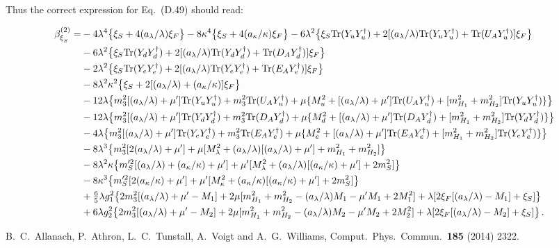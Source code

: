 \documentclass[final,3p,times,pdflatex]{elsarticle}
\newcommand{\lamsq}{\lambda^2}
\newcommand{\kapsq}{\kappa^2}
\newcommand{\tr}{\mathrm{Tr}}
\newcommand{\mhusq}{m^2_{H_2}}
\newcommand{\mhdsq}{m^2_{H_1}}
\newcommand{\mlamsq}{M_\lambda^2}
\newcommand{\mkapsq}{M_\kappa^2}
\newcommand{\mssq}{m_S^2}
\newcommand{\mtrisq}{m_3^2}
\newcommand{\msprsq}{m_S'^2}
\newcommand{\Alam}{a_\lambda/\lambda}
\newcommand{\Akap}{a_\kappa/\kappa}
\newcommand{\Musq}{M_u^2}
\newcommand{\Mdsq}{M_d^2}
\newcommand{\Mesq}{M_e^2}
\begin{document}
Thus the correct expression for Eq.\ (D.49) should read:

\begin{align}
  \beta_{\xi^{}_S}^{(2)} =& -4\lambda^4\big\{ \xi_S + 4(\Alam)\xi_F\big\}
  - 8\kappa^4\big\{ \xi_S + 4(\Akap)\xi_F\big\}
  -6\lamsq\big\{ \xi_S\tr( Y_u Y_u^\dagger)+ 2[(\Alam)\tr( Y_u Y_u^\dagger) + \tr( U_A Y_u^\dagger)] \xi_F \big\} \notag \\
  &-6\lamsq\big\{\xi_S\tr( Y_d Y_d^\dagger) + 2[(\Alam)\tr( Y_d Y_d^\dagger) + \tr( D_A Y_d^\dagger)] \xi_F\big\}  \notag \\
  &-2\lamsq\big\{\xi_S\tr( Y_e Y_e^\dagger) + 2[(\Alam)\tr( Y_e Y_e^\dagger) + \tr( E_A Y_e^\dagger)] \xi_F \big\} \notag \\
  &-8\lamsq\kapsq\big\{ \xi_S + 2[(\Alam) + (\Akap)]\xi_F\big\} \notag \\
  &-12\lambda\big\{ \mtrisq[(\Alam) + \mu']\tr( Y_u Y_u^\dagger) + \mtrisq\tr( U_A Y_u^\dagger)
  + \mu\{\Musq + [(\Alam) + \mu']\tr( U_A Y_u^\dagger) + [\mhdsq + \mhusq]\tr( Y_u Y_u^\dagger)\} \big\} \notag \\
  &-12\lambda\big\{ \mtrisq[(\Alam) + \mu']\tr( Y_d Y_d^\dagger) + \mtrisq\tr( D_A Y_d^\dagger)
  + \mu\{\Mdsq + [(\Alam) +\mu']\tr( D_A Y_d^\dagger) + [\mhdsq + \mhusq]\tr( Y_d Y_d^\dagger)\} \big\}  \notag \\
  &-4\lambda\big\{ \mtrisq[(\Alam)+ \mu']\tr( Y_e Y_e^\dagger) + \mtrisq\tr( E_A Y_e^\dagger)
  + \mu\{\Mesq + [(\Alam) +\mu']\tr( E_A Y_e^\dagger) + [\mhdsq + \mhusq]\tr( Y_e Y_e^\dagger)\} \big\} \notag \\
  &-8\lambda^3\big\{ \mtrisq[2(\Alam) + \mu'] + \mu[\mlamsq + (\Alam)[(\Alam) + \mu'] + \mhdsq + \mhusq]\big\} \notag \\
  &-8\lamsq\kappa\big\{ \msprsq[(\Alam) + (\Akap) + \mu']
  + \mu'[\mlamsq + (\Alam)[(\Akap) + \mu'] + 2\mssq] \big\} \notag \\
  &-8\kappa^3\big\{ \msprsq[2(\Akap) + \mu']
  + \mu'[\mkapsq + (\Akap)[(\Akap) + \mu'] + 2\mssq] \big\} \notag \\
  &+ \tfrac{6}{5}\lambda g_1^2\big\{ 2\mtrisq[(\Alam) + \mu' - M_1]
  + 2\mu[\mhdsq + \mhusq -(\Alam)M_1 - \mu' M_1 + 2M_1^2]
  + \lambda[2\xi_F[(\Alam) - M_1]  + \xi_S] \big\} \notag \\
  &+6\lambda g_2^2\big\{ 2\mtrisq[(\Alam) + \mu' - M_2]
  + 2\mu[\mhdsq + \mhusq - (\Alam)M_2 - \mu' M_2 + 2M_2^2]
  + \lambda[2\xi_F[(\Alam) - M_2] + \xi_S] \big\}\,.
  \end{align}


\begin{thebibliography}{10}
  B.~C.~Allanach, P.~Athron, L.~C.~Tunstall, A.~Voigt and A.~G.~Williams,
  Comput.\ Phys.\ Commun.\  {\bf 185} (2014) 2322.
\end{thebibliography}
\end{document}
